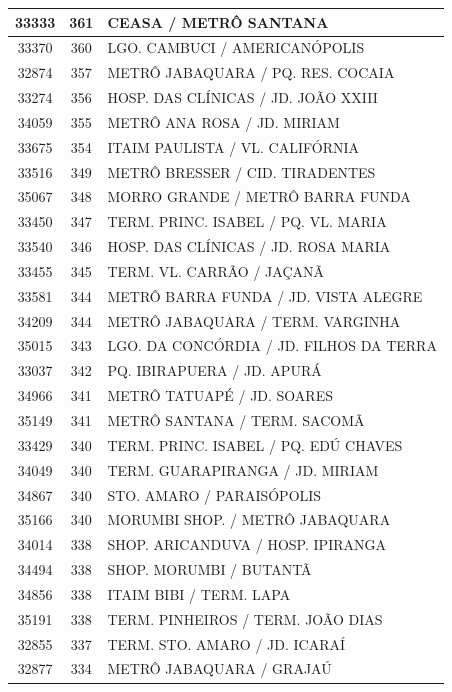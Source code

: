 \documentclass[
	12pt,				%
	oneside,			%
	a4paper,			%
	english,			%
	brazil				%
	]{abntex2ppgsi}
\begin{document}
{{\begin{apendicesenv}
\begin{longtable}{c|c|p{7cm}}
 \hline 
33333 &	361 &	CEASA / METRÔ SANTANA \\ 
 \hline 
33370 &	360 &	LGO. CAMBUCI / AMERICANÓPOLIS \\ 
 \hline 
32874 &	357 &	METRÔ JABAQUARA / PQ. RES. COCAIA \\ 
 \hline 
33274 &	356 &	HOSP. DAS CLÍNICAS / JD. JOÃO XXIII \\ 
 \hline 
34059 &	355 &	METRÔ ANA ROSA / JD. MIRIAM \\ 
 \hline 
33675 &	354 &	ITAIM PAULISTA / VL. CALIFÓRNIA \\ 
 \hline 
33516 &	349 &	METRÔ BRESSER / CID. TIRADENTES \\ 
 \hline 
35067 &	348 &	MORRO GRANDE / METRÔ BARRA FUNDA \\ 
 \hline 
33450 &	347 &	TERM. PRINC. ISABEL / PQ. VL. MARIA \\ 
 \hline 
33540 &	346 &	HOSP. DAS CLÍNICAS / JD. ROSA MARIA \\ 
 \hline 
33455 &	345 &	TERM. VL. CARRÃO / JAÇANÃ \\ 
 \hline 
33581 &	344 &	METRÔ BARRA FUNDA / JD. VISTA ALEGRE \\ 
 \hline 
34209 &	344 &	METRÔ JABAQUARA / TERM. VARGINHA \\ 
 \hline 
35015 &	343 &	LGO. DA CONCÓRDIA / JD. FILHOS DA TERRA \\ 
 \hline 
33037 &	342 &	PQ. IBIRAPUERA / JD. APURÁ \\ 
 \hline 
34966 &	341 &	METRÔ TATUAPÉ / JD. SOARES \\ 
 \hline 
35149 &	341 &	METRÔ SANTANA / TERM. SACOMÃ \\ 
 \hline 
33429 &	340 &	TERM. PRINC. ISABEL / PQ. EDÚ CHAVES \\ 
 \hline 
34049 &	340 &	TERM. GUARAPIRANGA / JD. MIRIAM \\ 
 \hline 
34867 &	340 &	STO. AMARO / PARAISÓPOLIS \\ 
 \hline 
35166 &	340 &	MORUMBI SHOP. / METRÔ JABAQUARA \\ 
 \hline 
34014 &	338 &	SHOP. ARICANDUVA / HOSP. IPIRANGA \\ 
 \hline 
34494 &	338 &	SHOP. MORUMBI / BUTANTÃ \\ 
 \hline 
34856 &	338 &	ITAIM BIBI / TERM. LAPA \\ 
 \hline 
35191 &	338 &	TERM. PINHEIROS / TERM. JOÃO DIAS \\ 
 \hline 
32855 &	337 &	TERM. STO. AMARO / JD. ICARAÍ \\ 
 \hline 
32877 &	334 &	METRÔ JABAQUARA / GRAJAÚ \\ 

\end{longtable}
\end{apendicesenv}}}
\end{document}
